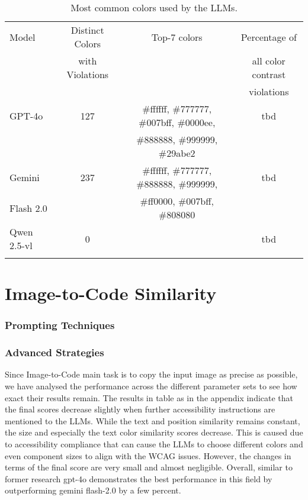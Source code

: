 \begin{table}[ht]
\centering
\caption{Most common colors used by the LLMs.}
  \label{tab:colors}
  \begin{tabular}{lccc}
  \toprule
  Model        & Distinct Colors                 & Top-7 colors     & Percentage of       \\
               &         with Violations         &                  & all color contrast   \\ 
               &                                 &                  &  violations          \\ \midrule
  GPT-4o       & 127          & \#ffffff, \#777777, \#007bff, \#0000ee,  & tbd \\
               &              & \#888888, \#999999, \#29abe2              &  \\
  Gemini       & 237          & \#ffffff, \#777777, \#888888, \#999999,  & tbd \\
  Flash 2.0    &              & \#ff0000, \#007bff, \#808080               &  \\
  Qwen 2.5-vl  & 0            &     & tbd \\
               &              &     &     \\
  \bottomrule
  \end{tabular}
\end{table}


\section{Image-to-Code Similarity}
\subsubsection{Prompting Techniques}
\subsubsection{Advanced Strategies}
Since Image-to-Code main task is to copy the input image as precise as possible,
we have analysed the performance across the different parameter sets to see how 
exact their results remain. The results in table as in the appendix 
indicate that the final scores decrease slightly when further accessibility 
instructions are mentioned to the LLMs. While the text and position similarity 
remains constant, the size and especially the text color similarity scores 
decrease. This is caused due to accessibility compliance that can cause the
LLMs to choose different colors and even component sizes to align with the 
WCAG issues. However, the changes in terms of the final score are very small 
and almost negligible.\newline
Overall, similar to former research gpt-4o demonstrates the best performance 
in this field by outperforming gemini flash-2.0 by a few percent.




